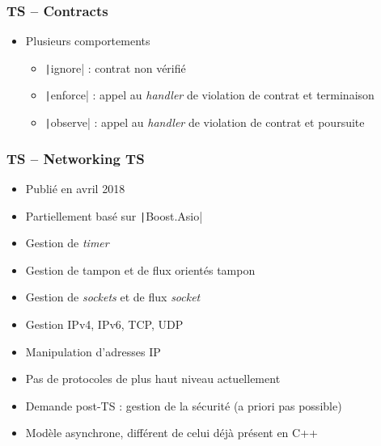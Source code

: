 \documentclass[C++.tex]{subfiles}
\begin{document}
\begin{frame}[fragile]
\frametitle{TS -- Contracts}
	\begin{itemize}
		\item Plusieurs comportements
		\begin{itemize}
			\item \texttt|ignore| : contrat non vérifié
			\item \texttt|enforce| : appel au \textit{handler} de violation de contrat et terminaison
			\item \texttt|observe| : appel au \textit{handler} de violation de contrat et poursuite

		\end{itemize}
	\end{itemize}

\end{frame}

\begin{frame}[fragile]
	\frametitle{TS -- Networking TS}
	\begin{itemize}
		\item Publié en avril 2018
		\item Partiellement basé sur \texttt|Boost.Asio|
		\item Gestion de \textit{timer}
		\item Gestion de tampon et de flux orientés tampon
		\item Gestion de \textit{sockets} et de flux \textit{socket}
		\item Gestion IPv4, IPv6, TCP, UDP
		\item Manipulation d'adresses IP
		\item Pas de protocoles de plus haut niveau actuellement
		\item Demande post-TS : gestion de la sécurité (a priori pas possible)
		\item Modèle asynchrone, différent de celui déjà présent en C++
	\end{itemize}

\end{frame}
\end{document}
